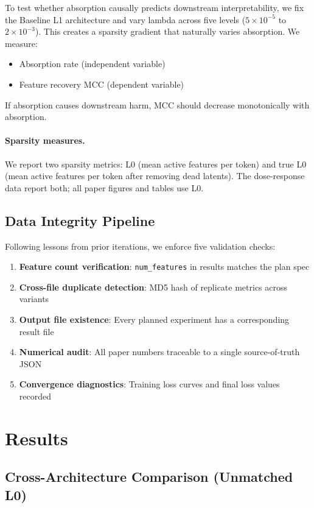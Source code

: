 \documentclass{article}
\begin{document}
To test whether absorption causally predicts downstream interpretability, we fix the Baseline L1 architecture and vary lambda across five levels ($5\times10^{-5}$ to $2\times10^{-3}$). This creates a sparsity gradient that naturally varies absorption. We measure:
\begin{itemize}
    \item Absorption rate (independent variable)
    \item Feature recovery MCC (dependent variable)
\end{itemize}
If absorption causes downstream harm, MCC should decrease monotonically with absorption.

\paragraph{Sparsity measures.} We report two sparsity metrics: L0 (mean active features per token) and true L0 (mean active features per token after removing dead latents). The dose-response data report both; all paper figures and tables use L0.

\subsection{Data Integrity Pipeline}

Following lessons from prior iterations, we enforce five validation checks:
\begin{enumerate}
    \item \textbf{Feature count verification}: \texttt{num\_features} in results matches the plan spec
    \item \textbf{Cross-file duplicate detection}: MD5 hash of replicate metrics across variants
    \item \textbf{Output file existence}: Every planned experiment has a corresponding result file
    \item \textbf{Numerical audit}: All paper numbers traceable to a single source-of-truth JSON
    \item \textbf{Convergence diagnostics}: Training loss curves and final loss values recorded
\end{enumerate}

\section{Results}

\subsection{Cross-Architecture Comparison (Unmatched L0)}
\end{document}
